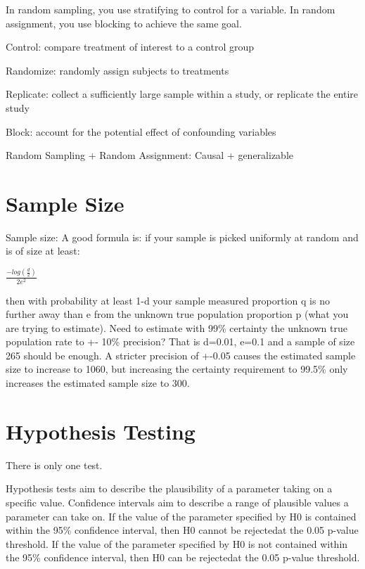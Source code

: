\documentclass[]{book}
\begin{document}
In random sampling, you use stratifying to control for a variable. In random assignment, you use blocking to achieve the same goal.

Control: compare treatment of interest to a control group

Randomize: randomly assign subjects to treatments

Replicate: collect a sufficiently large sample within a study, or replicate the entire study

Block: account for the potential effect of confounding variables

Random Sampling + Random Assignment: Causal + generalizable

\hypertarget{sample-size}{%
\section{Sample Size}\label{sample-size}}

Sample size: A good formula is: if your sample is picked uniformly at random and is of size at least:

\(\frac{-log(\frac{d}{2})}{2e^2}\)

then with probability at least 1-d your sample measured proportion q is no further away than e from the unknown true population proportion p (what you are trying to estimate). Need to estimate with 99\% certainty the unknown true population rate to +- 10\% precision? That is d=0.01, e=0.1 and a sample of size 265 should be enough. A stricter precision of +-0.05 causes the estimated sample size to increase to 1060, but increasing the certainty requirement to 99.5\% only increases the estimated sample size to 300.

\hypertarget{hypothesis-testing}{%
\section{Hypothesis Testing}\label{hypothesis-testing}}

There is only one test.

Hypothesis tests aim to describe the plausibility of a parameter taking on a specific value. Confidence intervals aim to describe a range of plausible values a parameter can take on. If the value of the parameter specified by H0 is contained within the 95\% confidence interval, then H0 cannot be rejectedat the 0.05 p-value threshold. If the value of the parameter specified by H0 is not contained within the 95\% confidence interval, then H0 can be rejectedat the 0.05 p-value threshold.
\end{document}
